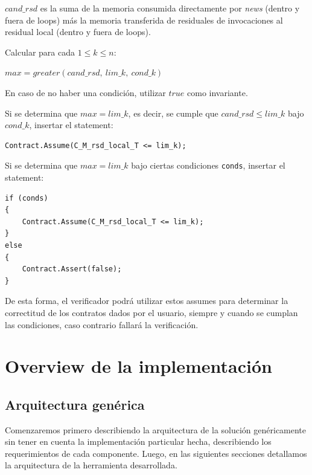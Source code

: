 \documentclass[12pt,a4paper]{article}
\newcommand\mono[1]{\texttt{#1}}
\begin{document}
				$cand\_rsd$ es la suma de la memoria consumida directamente por \textit{news} (dentro y fuera de loops) más la memoria transferida de residuales de invocaciones al residual local (dentro y fuera de loops).

				Calcular para cada $1 \leq k \leq n$:

				\begin{center}
				$max = greater(cand\_rsd,\ lim\_k,\ cond\_k)$
				\end{center}

				En caso de no haber una condición, utilizar $true$ como invariante.

				Si se determina que $max = lim\_k$, es decir, se cumple que $cand\_rsd \leq lim\_k$ bajo $cond\_k$, insertar el statement:

				\vspace{5pt}
				\begin{lstlisting}[numbers=none]
Contract.Assume(C_M_rsd_local_T <= lim_k);
				\end{lstlisting}

				Si se determina que $max = lim\_k$ bajo ciertas condiciones \mono{conds}, insertar el statement:

				\vspace{5pt}
				\begin{lstlisting}[numbers=none]
if (conds)
{
	Contract.Assume(C_M_rsd_local_T <= lim_k);
}
else
{
	Contract.Assert(false);
}
				\end{lstlisting}

				De esta forma, el verificador podrá utilizar estos assumes para determinar la correctitud de los contratos dados por el usuario, siempre y cuando se cumplan las condiciones, caso contrario fallará la verificación.

	\newpage
	\section{Overview de la implementación} \label{sec:overimpl}
		\subsection{Arquitectura genérica}
			Comenzaremos primero describiendo la arquitectura de la solución genéricamente sin tener en cuenta la implementación particular hecha, describiendo los requerimientos de cada componente. Luego, en las siguientes secciones detallamos la arquitectura de la herramienta desarrollada.
\end{document}
